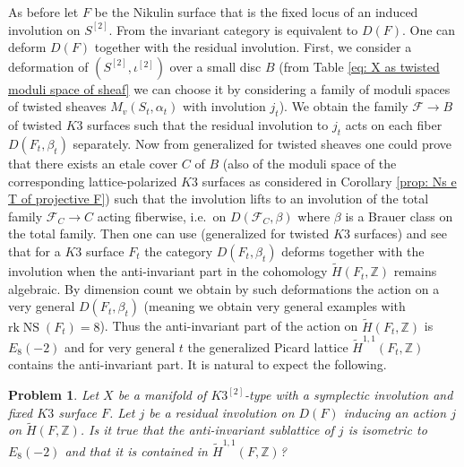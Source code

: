 \documentclass{amsart}
\newtheorem{prob}[thm]{Problem}
\theoremstyle{definition}
\numberwithin{equation}{section}
\numberwithin{equation}{section} \theoremstyle{definition}
\DeclareMathOperator{\NS}{NS}
\newcommand\ZZ{{\mathbb Z}}
\newcommand\rk{\mathrm{rk}}
\begin{document}
 As before let $F$ be the Nikulin surface that is the fixed locus of an induced involution on $S^{[2]}$.
From \cite[Section 7.3]{BO} the invariant category is equivalent to $D(F)$. 
One can deform $D(F)$ together with the residual involution. First, we consider a deformation of $(S^{[2]}, \iota^{[2]})$ over a small disc $B$ (from Table \ref{eq: X as twisted moduli space of sheaf} we can choose it by considering a family of moduli spaces of twisted sheaves $M_v(S_t,\alpha_t)$ with involution $j_t$). 
We obtain the family $\mathcal{F}\to B$ of twisted $K3$ surfaces  such that the residual involution to $j_t$ acts on each fiber $D(F_t,\beta_t)$ separately.
Now from \cite[Proposition 3.9]{BP} generalized for twisted sheaves one could prove that there exists an etale cover $C$ of $B$ (also of the moduli space of the corresponding lattice-polarized $K3$ surfaces as considered in Corollary \ref{prop: Ns e T of projective F}) such that the involution lifts to an involution of the total family $\mathcal{F}_C\to C$ acting fiberwise, i.e.~on $D(\mathcal{F}_C, \beta)$ where $\beta$ is a Brauer class on the total family. 
Then one can use \cite[Section 4.3]{HMS} (generalized for twisted $K3$ surfaces) and see that for a $K3$ surface $F_t$ the category $D(F_t,\beta_t)$ deforms together with the involution when the anti-invariant part in the cohomology $\tilde{H}(F_t,\ZZ)$ remains algebraic.
By dimension count we obtain by such deformations the action on a very general $D(F_t,\beta_t)$ (meaning we obtain very general examples with $\rk \NS(F_t)=8$). Thus the anti-invariant part of the action on $\tilde{H}(F_t,\ZZ)$ is $E_8(-2)$ and for very general $t$ the generalized Picard lattice $\tilde{H}^{1,1}(F_t,\ZZ)$ contains the anti-invariant part.
It is natural to expect the following.

    \begin{prob}
Let $X$ be a manifold of $K3^{[2]}$-type with a symplectic involution and fixed $K3$ surface $F$. Let $j$ be a residual involution on $D(F)$ inducing an action
 $j$ on $\tilde{H}(F,\ZZ)$. Is it true that the anti-invariant sublattice of $j$ is isometric to $E_8(-2)$ and that it is contained in $\tilde{H}^{1,1}(F,\ZZ)$?
    \end{prob}
\end{document}

